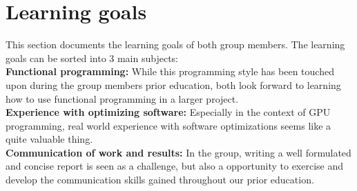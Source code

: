 \section{Learning goals}
This section documents the learning goals of both group members. The learning goals can be sorted into 3 main subjects:\\

\textbf{Functional programming:} While this programming style has been touched upon during the group members prior education, both look forward to learning how to use functional programming in a larger project.\\

\textbf{Experience with optimizing software:} Especially in the context of GPU programming, real world experience with software optimizations seems like a quite valuable thing.\\

\textbf{Communication of work and results:} In the group, writing a well formulated and concise report is seen as a challenge, but also a opportunity to exercise and develop the communication skills gained throughout our prior education.